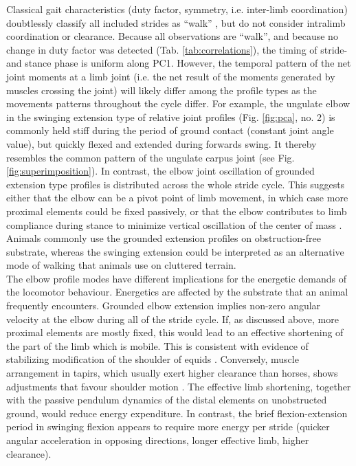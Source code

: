 Classical gait characteristics (duty factor, symmetry, i.e. inter-limb coordination) doubtlessly classify all included strides as ``walk'' \citep{Hildebrand1989}, but do not consider intralimb coordination or clearance.
Because all observations are ``walk'', and because no change in duty factor was detected (Tab. \ref{tab:correlations}), the timing of stride- and stance phase is uniform along PC1.
However, the temporal pattern of the net joint moments at a limb joint (i.e. the net result of the moments generated by muscles crossing the joint) will likely differ among the profile types as the movements patterns throughout the cycle differ.
For example, the ungulate elbow in the swinging extension type of relative joint profiles (Fig. \ref{fig:pca}, no. 2) is commonly held stiff during the period of ground contact (constant joint angle value), but quickly flexed and extended during forwards swing.
It thereby resembles the common pattern of the ungulate carpus joint (see Fig. \ref{fig:superimposition}).
In contrast, the elbow joint oscillation of grounded extension type profiles is distributed across the whole stride cycle.
This suggests either that the elbow can be a pivot point of limb movement, in which case more proximal elements could be fixed passively, or that the elbow contributes to limb compliance during stance to minimize vertical oscillation of the center of mass \citep[\textit{cf.}][]{Geyer2006}.
Animals commonly use the grounded extension profiles on obstruction-free substrate, whereas the swinging extension could be interpreted as an alternative mode of walking that animals use on cluttered terrain.
\\The elbow profile modes have different implications for the energetic demands of the locomotor behaviour.
Energetics are affected by the substrate that an animal frequently encounters.
Grounded elbow extension implies non-zero angular velocity at the elbow during all of the stride cycle.
If, as discussed above, more proximal elements are mostly fixed, this would lead to an effective shortening of the part of the limb which is mobile.
This is consistent with evidence of stabilizing modification of the shoulder of equids \citep[][]{Hermanson1992}.
Conversely, muscle arrangement in tapirs, which usually exert higher clearance than horses, shows adjustments that favour shoulder motion \citep{MacLaren2016}.
The effective limb shortening, together with the passive pendulum dynamics of the distal elements on unobstructed ground, would reduce energy expenditure.
In contrast, the brief flexion-extension period in swinging flexion appears to require more energy per stride (quicker angular acceleration in opposing directions, longer effective limb, higher clearance).
